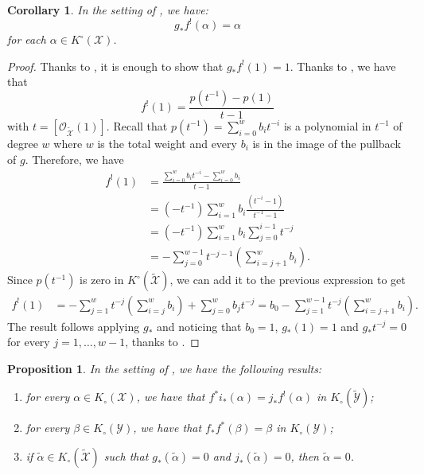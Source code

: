 \documentclass[12pt]{amsart}
\newcommand{\sO}{\mathscr{O}}
\newcommand{\cX}{\mathcal{X}}
\newcommand{\cY}{\mathcal{Y}}
\newcommand{\tcX}{\widetilde{\mathcal{X}}}
\newcommand{\Kring}{K^{\circ}}
\newcommand{\Kgroup}{K_{\circ}}
\newtheorem{Cor}[theorem]{Corollary}
\newtheorem{Prop}[theorem]{Proposition}
\theoremstyle{definition}
\begin{document}
\begin{Cor}\label{cor: push-forward-upper-shriek}
    In the setting of , we have:
        $$g_*f^!(\alpha)=\alpha$$ for each $\alpha \in \Kring(\cX)$.
\end{Cor}
\begin{proof}
    Thanks to , it is enough to show that $g_*f^{!}(1)=1$. Thanks to , we have that
    $$ f^{!}(1)= \frac{p(t^{-1})-p(1)}{t-1}$$
    with $t=[\sO_{\tcX}(1)]$. Recall that $p(t^{-1})= \sum_{i=0}^{w} b_it^{-i}$ is a polynomial in $t^{-1}$ of degree $w$ where $w$ is the total weight and every $b_i$ is in the image of the pullback of $g$. Therefore, we have
      \begin{align*}
         f^{!}(1) & = \frac{  \sum_{i=0}^{w} b_it^{-i} -{ \sum_{i=0}^{w} b_i}}{t-1} \\
         & =(-t^{-1})  \sum_{i=1}^{w} b_i\frac{(t^{-i}-1)}{t^{-1}-1} \\
         & = (-t^{-1})\sum_{i=1}^{w} b_i \sum_{j=0}^{i-1} t^{-j} \\
         & = -\sum_{j=0}^{w-1} t^{-j-1} \left(\sum_{i=j+1}^{w} b_i\right).
     \end{align*}
     Since $p(t^{-1})$ is zero in $\Kring(\widetilde{\cX})$, we can add it to the previous expression to get
     \begin{align*}
         f^{!}(1) &= -\sum_{j=1}^{w} t^{-j} \left(\sum_{i=j}^{w} b_i\right) + \sum_{j=0}^{w} b_jt^{-j}= b_0 - \sum_{{j=1}}^{w-1}t^{-j} \left(\sum_{i=j+1}^{w} b_i\right).
     \end{align*}
     The result follows applying $g_*$ and noticing that $b_0=1$, $g_*(1)=1$ and $g_*t^{-j}=0$ for every $j=1,\dots,w-1$, thanks to .
\end{proof}
\begin{Prop}\label{prop:fulton}
    In the setting of , we have the following results:
    \begin{enumerate}[label=$(\alph*)$]
        \item\label{point: a} for every $\alpha \in \Kgroup(\cX)$, we have that $f^*i_*(\alpha)=j_*f^!(\alpha)$ in $\Kgroup(\widetilde{\cY})$;
        \item\label{point: b} for every $\beta \in  \Kgroup(\cY)$, we have that $f_*f^*(\beta)=\beta$ in $\Kgroup(\cY)$;
        \item\label{point: c} if $\widetilde{\alpha} \in \Kgroup(\widetilde{\cX})$ such that $g_*(\widetilde{\alpha})=0$ and $j_*(\widetilde{\alpha})=0$, then $\widetilde{\alpha}=0$.
    \end{enumerate}
    \end{Prop}
\end{document}
